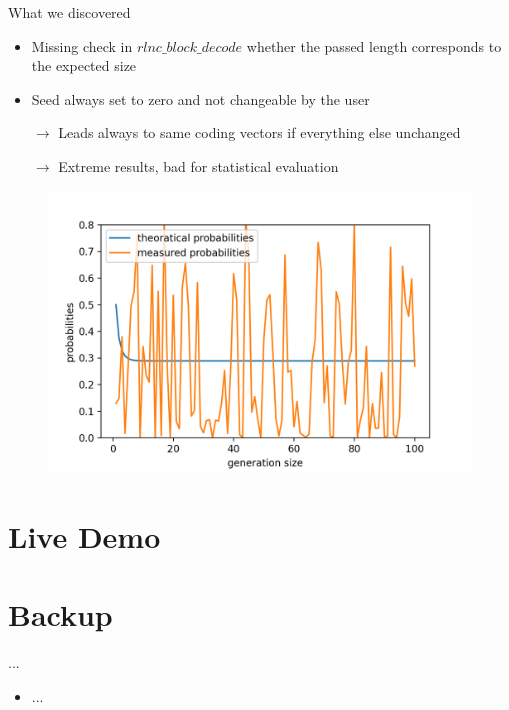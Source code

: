 \documentclass[t]{beamer} %
\begin{document}
\begin{frame}{What we discovered}
	\begin{itemize}
		\item Missing check in \texttt{$rlnc\_block\_decode$} whether the passed length corresponds to the expected size
		\item Seed always set to zero and not changeable by the user
		\item[$\rightarrow$] Leads always to same coding vectors if everything else unchanged
		\item[$\rightarrow$] Extreme results, bad for statistical evaluation
	\end{itemize}
	\begin{figure}[htb]
		\centering
		\includegraphics[scale=0.45]{figures/gf2_noseed}
	\end{figure}
\end{frame}




\section{Live Demo}



\appendix
{}
\section{Backup}
\begin{frame}{...}
	\begin{itemize}
		\item ...
	\end{itemize}
\end{frame}
\end{document}
